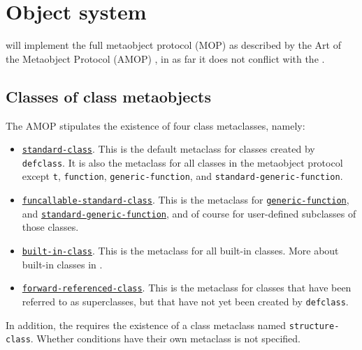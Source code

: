 \chapter{Object system}

\sysname{} will implement the full metaobject protocol (MOP) as
described by the Art of the Metaobject Protocol (AMOP)
\cite{Kiczales:1991:AMP:574212}, in as far it does not conflict with
the \hs{}.


\section{Classes of class metaobjects}

The AMOP stipulates the existence of four class metaclasses, namely:

\begin{itemize}
\item \href{http://www.metamodular.com/CLOS-MOP/class-standard-class.html}
  {\texttt{standard-class}}.
  This is the default metaclass for classes
  created by \texttt{defclass}.  It is also the metaclass for all
  classes in the metaobject protocol except \texttt{t},
  \texttt{function}, \texttt{generic-function}, and
  \texttt{standard-generic-function}. 
\item \href{http://www.metamodular.com/CLOS-MOP/class-funcallable-standard-class.html}
{\texttt{funcallable-standard-class}}.
This is the metaclass for
\href{http://www.metamodular.com/CLOS-MOP/class-generic-function.html}
{\texttt{generic-function}}, 
and 
\href{http://www.metamodular.com/CLOS-MOP/class-standard-generic-function.html}
{\texttt{standard-generic-function}},
and of course for user-defined subclasses of those classes. 
\item \href{http://www.metamodular.com/CLOS-MOP/class-built-in-class.html}
{\texttt{built-in-class}}.  
This is the metaclass for all built-in
classes.  More about built-in classes in
. 
\item \href{http://www.metamodular.com/CLOS-MOP/class-forward-referenced-class.html}
{\texttt{forward-referenced-class}}.  This is the metaclass for
  classes that have been referred to as superclasses, but that have
  not yet been created by \texttt{defclass}.
\end{itemize}

In addition, the \hs{} requires the existence of a class metaclass
named \texttt{structure-class}.  Whether conditions have their own
metaclass is not specified. 

